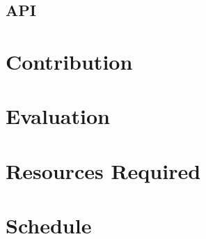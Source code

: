 \subsection{API}

\section{Contribution}

\section{Evaluation}

\section{Resources Required}

\section{Schedule}

